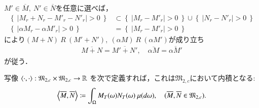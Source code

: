 	\begin{prf}
		$M' \in \overline{M},\ N' \in \overline{N}$を任意に選べば，
		\begin{align}
			\left\{\ \left|M_r + N_r - M'_r - N'_r \right| > 0\ \right\} &\subset \left\{\ \left|M_r - M'_r \right| > 0\ \right\} \cup \left\{\ \left|N_r - N'_r \right| > 0\ \right\} \\
			\left\{\ \left|\alpha M_r - \alpha M'_r \right| > 0\ \right\} &= \left\{\ \left|M_r - M'_r \right| > 0\ \right\}
		\end{align}
		により$(M+N)\ R\ (M'+N'),\ (\alpha M)\ R\ (\alpha M')$が成り立ち
		\begin{align}
			\overline{M+N} = \overline{M'+N'}, \quad \overline{\alpha M} = \overline{\alpha M'}
		\end{align}
		が従う．
		\QED
	\end{prf}
	
	\begin{screen}
		\begin{lem}
			写像\footnotemark
			$\inprod<\cdot,\cdot>:\mathfrak{M}_{2,c} \times \mathfrak{M}_{2,c} \rightarrow \R$
			を次で定義すれば，これは$\mathfrak{M}_{2,c}$において内積となる:
			\begin{align}
				\inprod<\overline{M},\overline{N}> \coloneqq \int_{\Omega} M_T(\omega)N_T(\omega)\ \mu(d\omega), \quad (\overline{M},\overline{N} \in \mathfrak{M}_{2,c}).
				\label{eq:M_2c_inner_product}
			\end{align}
			\label{lem:M_2c_hilbert_inner_product}
		\end{lem}
	\end{screen}
			
			
